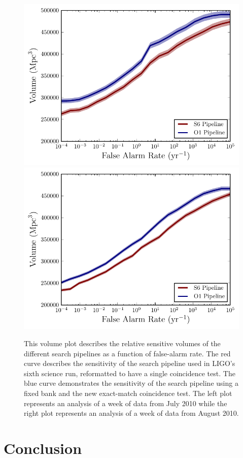 \documentclass[12pt]{iopart} \usepackage{graphicx,amssymb}
\begin{document}
\begin{figure}[t!bp]	
\begin{center}
\includegraphics[width=0.45\linewidth]{figures/volume_plots/final_configuration_w1.pdf}
\includegraphics[width=0.45\linewidth]{figures/volume_plots/final_configuration_w2.pdf}
\caption{This volume plot describes the relative sensitive volumes of the
different search pipelines as a function of false-alarm rate. The red curve
describes the sensitivity of the search pipeline used in LIGO's sixth science
run, reformatted to have a single coincidence test.  The blue curve
demonstrates the sensitivity of the search pipeline using a fixed bank and the
new exact-match coincidence test. The left plot represents an
analysis of a week of data from July 2010 while the right plot represents an
analysis of a week of data from August 2010.}
\label{fig:conc}
\end{center}
\end{figure}

\section{Conclusion}
\label{s:conc}
\end{document}

